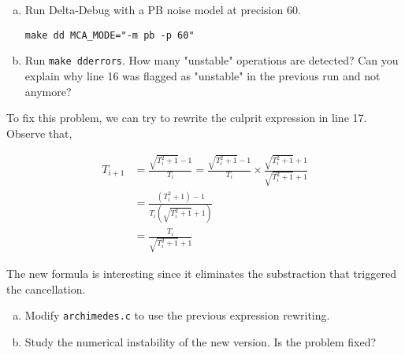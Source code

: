 \begin{question}
  \begin{enumerate}[(a)]
    \item Run Delta-Debug with a PB noise model at precision 60.
      \begin{verbatim}
make dd MCA_MODE="-m pb -p 60"
      \end{verbatim}
    \item Run \texttt{make dderrors}. How many "unstable" operations are detected?
      Can you explain why line 16 was flagged as "unstable" in the previous run and not anymore?
  \end{enumerate}
\end{question}

To fix this problem, we can try to rewrite the culprit expression in line 17.
Observe that,

\begin{align*}
  T_{i+1} &= \frac{\sqrt{T_i^2+1} - 1}{T_i} = \frac{\sqrt{T_i^2+1} - 1}{T_i} \times \frac{\sqrt{T_i^2+1} + 1}{\sqrt{T_i^2+1} + 1} \\
          &= \frac{(T_i^2 + 1) - 1}{T_i(\sqrt{T_i^2+1} + 1)} \\
          &= \frac{T_i}{\sqrt{T_i^2+1} + 1}
\end{align*}

The new formula is interesting since it eliminates the substraction that triggered the cancellation.

\begin{question}
  \begin{enumerate}[(a)]
    \item Modify \texttt{archimedes.c} to use the previous expression rewriting.
    \item Study the numerical instability of the new version. Is the problem fixed?
  \end{enumerate}
\end{question}
